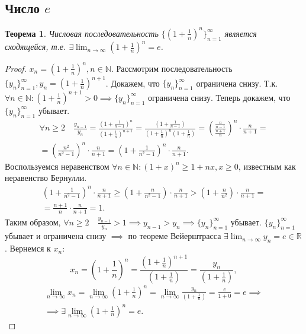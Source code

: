 \documentclass[a4paper,12pt]{article} %
\newtheorem{theorem}{Теорема}[section]
\theoremstyle{remark}
\theoremstyle{definition}
\begin{document}
\subsection{Число $e$}
\begin{theorem}
	Числовая последовательность $\{(1+\frac{1}{n})^{n}\}_{n=1}^{\infty}$ является сходящейся, т.е. $\exists \lim_{n \to \infty} (1+\frac{1}{n})^{n} = e$.
\end{theorem}
\begin{proof}
	$x_{n}=(1+\frac{1}{n})^{n}, n\in \mathbb{N}$. Рассмотрим последовательность  $\{y_n\}_{n=1}^{\infty}, y_{n} = (1+\frac{1}{n})^{n+1}$. Докажем,  что $\{y_n\}_{n=1}^{\infty}$ ограничена снизу. Т.к. $\forall n\in \mathbb{N} : (1+\frac{1}{n})^{n+1}>0 \implies \{y_n\}_{n=1}^{\infty}$ ограничена снизу. Теперь докажем, что $\{y_{n}\}_{n=1}^{\infty}$ убывает.
	\begin{multline}
		\forall n\ge 2 \quad \frac{y_{n-1}}{y_{n}} = \frac{(1+\frac{1}{n-1})^{n}}{(1+\frac{1}{n})^{n+1}} = \frac{(1+\frac{1}{n-1})}{(1+\frac{1}{n})^{n}(1+\frac{1}{n})}=\left(\frac{\frac{n}{n-1}}{\frac{n+1}{n}}\right)^{n} \cdot \frac{n}{n+1} = \\
		= \left(\frac{n^2}{n^2-1}\right)^{n} \cdot \frac{n}{n+1} = \left(1 + \frac{1}{n^2-1}\right)^{n} \cdot \frac{n}{n+1}.
	\end{multline}
	Воспользуемся неравенством $\forall n\in \mathbb{N} : (1+x)^{n} \ge 1+nx, x\ge 0$, известным как неравенство Бернулли.
	\begin{multline}
		\left(1 + \frac{1}{n^2-1}\right)^{n} \cdot \frac{n}{n+1} \ge \left(1+ \frac{n}{n^2-1}\right) \cdot  \frac{n}{n+1} > \left(1 + \frac{n}{n^2}\right) \cdot \frac{n}{n+1} = \\
		= \frac{n+1}{n} \cdot \frac{n}{n+1} = 1.
	\end{multline}
	Таким образом, $\forall n\ge 2 \quad \frac{y_{n-1}}{y_{n}} > 1 \implies y_{n-1} > y_{n} \implies \{y_n\}_{n=1}^{\infty}$ убывает. $\{y_n\}_{n=1}^{\infty}$ убывает и ограничена снизу $\implies$ по теореме Вейерштрасса $\exists \lim_{n \to \infty} y_n = e \in \mathbb{R}$. Вернемся к $x_n $:
	\[
		x_n = \left(1+\frac{1}{n}\right)^{n} = \frac{\left(1 + \frac{1}{n}\right)^{n+1}}{\left(1 + \frac{1}{n}\right)} = \frac{y_n}{\left(1 + \frac{1}{n}\right)} 
	,\] 
	\begin{multline}
	\lim_{n \to \infty} x_n = \lim_{n \to \infty} \left(1+\frac{1}{n}\right)^{n} = \lim_{n \to \infty} \frac{y_n}{\left(1 + \frac{1}{n}\right)} = \frac{e}{1 + 0} = e \implies \\
	\implies \exists \lim_{n \to \infty} \left(1 + \frac{1}{n}\right)^{n} = e.
	\end{multline}
	
\end{proof}
\end{document}
